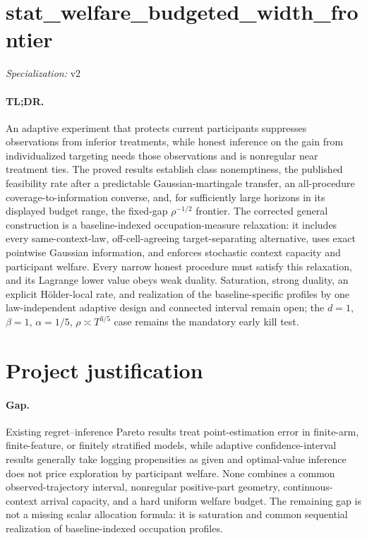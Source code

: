 \documentclass{article}
\begin{document}
\sloppy

\section*{stat\_\allowbreak{}welfare\_\allowbreak{}budgeted\_\allowbreak{}width\_\allowbreak{}frontier}

\noindent\textit{Specialization:} v2\par

\paragraph{TL;DR.} An adaptive experiment that protects current participants suppresses observations from inferior treatments, while honest inference on the gain from individualized targeting needs those observations and is nonregular near treatment ties. The proved results establish class nonemptiness, the published feasibility rate after a predictable Gaussian-martingale transfer, an all-procedure coverage-to-information converse, and, for sufficiently large horizons in its displayed budget range, the fixed-gap \(\rho^{-1/2}\) frontier. The corrected general construction is a baseline-indexed occupation-measure relaxation: it includes every same-context-law, off-cell-agreeing target-separating alternative, uses exact pointwise Gaussian information, and enforces stochastic context capacity and participant welfare. Every narrow honest procedure must satisfy this relaxation, and its Lagrange lower value obeys weak duality. Saturation, strong duality, an explicit H\"older-local rate, and realization of the baseline-specific profiles by one law-independent adaptive design and connected interval remain open; the \(d=1\), \(\beta=1\), \(\alpha=1/5\), \(\rho\asymp T^{3/5}\) case remains the mandatory early kill test.

\section{Project justification}

\paragraph{Gap.} Existing regret--inference Pareto results treat point-estimation error in finite-arm, finite-feature, or finitely stratified models, while adaptive confidence-interval results generally take logging propensities as given and optimal-value inference does not price exploration by participant welfare. None combines a common observed-trajectory interval, nonregular positive-part geometry, continuous-context arrival capacity, and a hard uniform welfare budget. The remaining gap is not a missing scalar allocation formula: it is saturation and common sequential realization of baseline-indexed occupation profiles.
\end{document}
